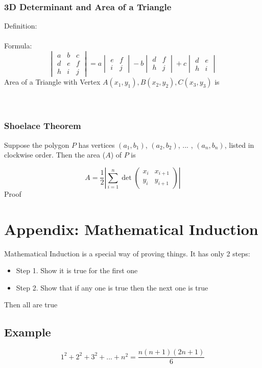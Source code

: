 \documentclass{article}
\begin{document}
\subsubsection{3D Determinant and Area of a Triangle}
Definition:\\ \\
Formula:
$$
\begin{vmatrix}
    a & b & c\\
    d & e & f\\
    h & i & j
\end{vmatrix}
=a
\begin{vmatrix}
   e  & f\\
   i  & j
\end{vmatrix}
-b
\begin{vmatrix}
   d  & f\\
   h  & j
\end{vmatrix}
+c
\begin{vmatrix}
   d  & e\\
   h  & i
\end{vmatrix}
$$
Area of a Triangle with Vertex $A(x_1,y_1), B(x_2,y_2), C(x_3,y_3)$ is \\ \\ \\

\subsubsection{Shoelace Theorem}

Suppose the polygon $P$ has vertices $(a_1, b_1)$, $(a_2, b_2)$, ... , $(a_n, b_n)$, listed in clockwise order. Then the area ($A$) of $P$ is

\[A = \dfrac{1}{2} \left|\sum_{i=1}^n{\det\begin{pmatrix}x_i&x_{i+1}\\y_i&y_{i+1}\end{pmatrix}}\right|\]
Proof

\pagebreak
\section*{Appendix: Mathematical Induction}

Mathematical Induction is a special way of proving things. It has only 2 steps:
\begin{itemize}
    \item Step 1. Show it is true for the first one
    \item Step 2. Show that if any one is true then the next one is true
\end{itemize}
Then all are true


\subsection*{Example}
$$1^2+2^2+3^2+...+n^2=\frac{n(n+1)(2n+1)}{6}$$
\end{document}
